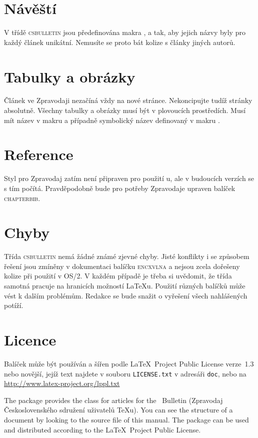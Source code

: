 \documentclass{csbulletin}
\let\pkg\textsc
\begin{document}
\section{Návěští}
V třídě \pkg{csbulletin} jsou předefinována makra ,  a  tak, aby
jejich názvy byly pro každý článek unikátní. Nemusíte se proto bát kolize s články jiných autorů.

\section{Tabulky a obrázky}
Článek ve Zpravodaji nezačíná vždy na nové stránce. Nekoncipujte tudíž stránky absolutně. Všechny
tabulky a obrázky musí být v plovoucích prostředích. Musí mít název v makru  a
případně symbolický název definovaný v makru .

\section{Reference}
Styl pro Zpravodaj zatím není připraven pro použití \BibTeX{}u, ale v budoucích verzích se s tím
počítá. Pravděpodobně bude pro potřeby Zpravodaje upraven balíček \pkg{chapterbib}.

\section{Chyby}
Třída \pkg{csbulletin} nemá žádné známé zjevné chyby. Jisté konflikty i se způsobem řešení jsou
zmíněny v dokumentaci balíčku \pkg{encxvlna} a nejsou zcela dořešeny kolize při použití v OS/2. V
každém případě je třeba si uvědomit, že třída samotná pracuje na hranicích možností \LaTeX{}u.
Použití různých balíčků může vést k dalším problémům. Redakce se bude snažit o vyřešení všech
nahlášených potíží.

\section{Licence}
Balíček může být používán a šířen podle \LaTeX\ Project Public License verze~1.3 nebo novější, jejíž
text najdete v souboru \texttt{LICENSE.txt} v adresáři \texttt{doc}, nebo na
\url{http://www.latex-project.org/lppl.txt}

\begin{summary}
The package provides the class for articles for the \cstug\ Bulletin (Zpravodaj Československého
sdružení uživatelů \TeX u). You can see the structure of a document by looking to the source file
of this manual. The package can be used and distributed according to the \LaTeX\ Project Public
License.
\end{summary}
\end{document}
